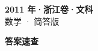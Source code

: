 \documentclass[zihao=-4, a4paper]{ctexart}
\begin{document}
\begin{center}
  {\Large\bfseries 2011 年·浙江卷·文科}\\[4pt]
  {\large 数学 · 简答版}
\end{center}
\medskip
{}

\clearpage
{}
\begin{center}{\Large\bfseries 答案速查}\end{center}
\medskip

\end{document}
